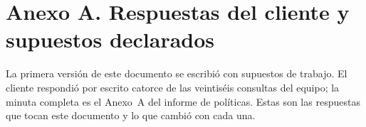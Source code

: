\documentclass[11pt,letterpaper]{article}
\begin{document}
\clearpage
\section*{Anexo A. Respuestas del cliente y supuestos declarados}
\label{anexo:trazabilidad}

La primera versión de este documento se escribió con supuestos de trabajo. El cliente respondió por
escrito catorce de las veintiséis consultas del equipo; la minuta completa es el Anexo~A del informe
de políticas. Estas son las respuestas que tocan este documento y lo que cambió con cada una.
\end{document}
